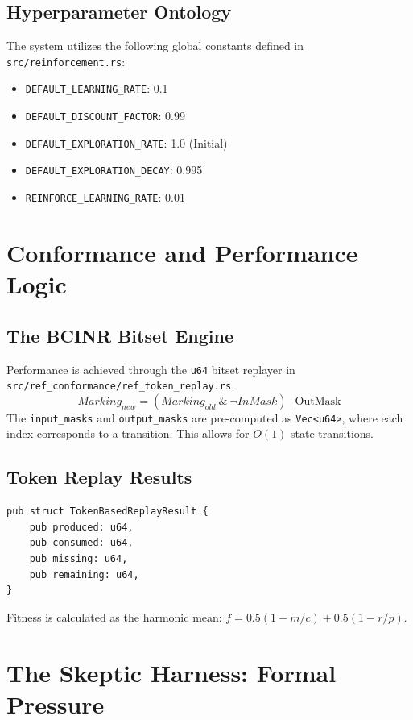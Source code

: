 \documentclass[12pt,a4paper]{report}
\begin{document}
\section{Hyperparameter Ontology}
The system utilizes the following global constants defined in \texttt{src/reinforcement.rs}:
\begin{itemize}
    \item \texttt{DEFAULT\_LEARNING\_RATE}: 0.1
    \item \texttt{DEFAULT\_DISCOUNT\_FACTOR}: 0.99
    \item \texttt{DEFAULT\_EXPLORATION\_RATE}: 1.0 (Initial)
    \item \texttt{DEFAULT\_EXPLORATION\_DECAY}: 0.995
    \item \texttt{REINFORCE\_LEARNING\_RATE}: 0.01
\end{itemize}

\chapter{Conformance and Performance Logic}
\section{The BCINR Bitset Engine}
Performance is achieved through the \texttt{u64} bitset replayer in \texttt{src/ref\_conformance/ref\_token\_replay.rs}. 
\begin{equation}
Marking_{new} = (Marking_{old} \ \& \ \neg InMask) \ | \ \text{OutMask}
\end{equation}
The \texttt{input\_masks} and \texttt{output\_masks} are pre-computed as \texttt{Vec<u64>}, where each index corresponds to a transition. This allows for $O(1)$ state transitions.

\section{Token Replay Results}
\begin{lstlisting}[caption=TBR Result]
pub struct TokenBasedReplayResult {
    pub produced: u64,
    pub consumed: u64,
    pub missing: u64,
    pub remaining: u64,
}
\end{lstlisting}
Fitness is calculated as the harmonic mean: $f = 0.5(1 - m/c) + 0.5(1 - r/p)$.

\chapter{The Skeptic Harness: Formal Pressure}
\end{document}
